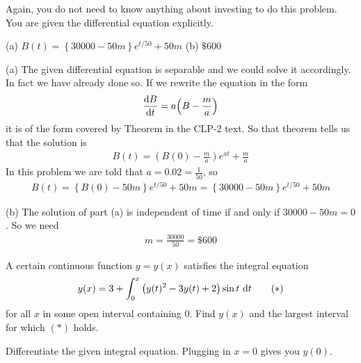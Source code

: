 \begin{hint}
Again, you do not need to know anything about investing
 to do this problem. You are given the differential equation explicitly.
\end{hint}

\begin{answer}
(a) $B(t) = \left\{30000-50m\right\} e^{t/50} + 50m$
\qquad (b) $\$600$
\end{answer}

\begin{solution} (a)
The given differential equation is separable and we could solve it
accordingly. In fact we have already done so. If we rewrite the equation in the
form
\begin{align*}
\diff{B}{t} = a\Big(B-\frac{m}{a}\Big)
\end{align*}
it is of the form covered by Theorem 
in the CLP-2 text. So that theorem tells us that the solution is
\begin{align*}
B(t) = \left(B(0)-\frac{m}{a}\right) e^{at} + \frac{m}{a}
\end{align*}
In this problem we are told that $a=0.02=\frac{1}{50}$, so
\begin{align*}
B(t) = \left\{B(0)-50m\right\} e^{t/50} + 50m
= \left\{30000-50m\right\} e^{t/50} + 50m
\end{align*}


\noindent (b)
The solution of part (a) is independent of time if and only if
$30000-50m=0$. So we need
\begin{align*}
m= \frac{30000}{50} = \$600
\end{align*}

\end{solution}

\begin{Mquestion}[M121 1999A]
A certain continuous function $y=y(x)$ satisfies the integral
equation
\begin{equation}
y(x)=3+\int_0^x\big(y(t)^2-3y(t)+2\big)\sin t\ \dee{t}
\tag{$*$}\end{equation}
for all $x$ in some open interval containing $0$. Find $y(x)$ and the largest
interval for which $(*)$ holds.
\end{Mquestion}

\begin{hint}
Differentiate the given integral equation. Plugging in $x=0$ gives you $y(0)$.
\end{hint}


